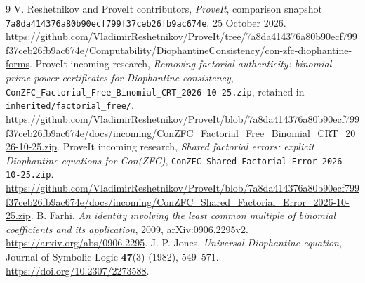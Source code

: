 \documentclass[11pt]{article}
\begin{document}
\begingroup\raggedright
\begin{thebibliography}{9}
 V. Reshetnikov and ProveIt contributors,
\emph{ProveIt}, comparison snapshot
\texttt{7a8da414376a80b90ecf799f37ceb26fb9ac674e}, 25 October 2026.
\url{https://github.com/VladimirReshetnikov/ProveIt/tree/7a8da414376a80b90ecf799f37ceb26fb9ac674e/Computability/DiophantineConsistency/con-zfc-diophantine-forms}.
 ProveIt incoming research,
\emph{Removing factorial authenticity: binomial prime-power certificates
for Diophantine consistency},
\nolinkurl{ConZFC_Factorial_Free_Binomial_CRT_2026-10-25.zip},
retained in \nolinkurl{inherited/factorial_free/}.
\url{https://github.com/VladimirReshetnikov/ProveIt/blob/7a8da414376a80b90ecf799f37ceb26fb9ac674e/docs/incoming/ConZFC_Factorial_Free_Binomial_CRT_2026-10-25.zip}.
 ProveIt incoming research,
\emph{Shared factorial errors: explicit Diophantine equations for Con(ZFC)},
\nolinkurl{ConZFC_Shared_Factorial_Error_2026-10-25.zip}.
\url{https://github.com/VladimirReshetnikov/ProveIt/blob/7a8da414376a80b90ecf799f37ceb26fb9ac674e/docs/incoming/ConZFC_Shared_Factorial_Error_2026-10-25.zip}.
 B. Farhi,
\emph{An identity involving the least common multiple of binomial
coefficients and its application}, 2009, arXiv:0906.2295v2.
\url{https://arxiv.org/abs/0906.2295}.
 J. P. Jones, \emph{Universal Diophantine equation},
Journal of Symbolic Logic \textbf{47}(3) (1982), 549--571.
\url{https://doi.org/10.2307/2273588}.
\end{thebibliography}
\endgroup


\appendix
\end{document}
